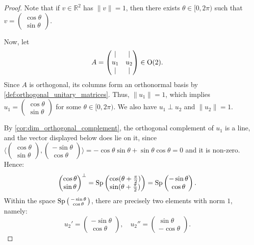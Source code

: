 \begin{proof}
Note that if $v \in \mathbb{R}^2$ has $\|v\| = 1$, then there exists $\theta \in [0, 2\pi)$ such that $v = \left(\begin{smallmatrix} \cos\theta \\ \sin\theta \end{smallmatrix}\right)$.

Now, let
\[
    A = \begin{pmatrix} | & | \\ u_1 & u_2 \\ | & | \end{pmatrix} \in \operatorname{O}(2).
\]
Since $A$ is orthogonal, its columns form an orthonormal basis by \cref{def:orthogonal_unitary_matrices}. Thus, $\|u_1\| = 1$, which implies $u_1 = \left(\begin{smallmatrix} \cos\theta \\ \sin\theta \end{smallmatrix}\right)$ for some $\theta \in [0, 2\pi)$. 
We also have $u_1 \perp u_2$ and $\|u_2\| = 1$. 

By \cref{cor:dim_orthogonal_complement}, the orthogonal complement of $u_1$ is a line, and the vector displayed below does lie on it, since $\langle \left(\begin{smallmatrix} \cos\theta \\ \sin\theta \end{smallmatrix}\right), \left(\begin{smallmatrix} -\sin\theta \\ \cos\theta \end{smallmatrix}\right) \rangle = -\cos\theta\sin\theta + \sin\theta\cos\theta = 0$ and it is non-zero. Hence:
\[ \begin{pmatrix} \cos\theta \\ \sin\theta \end{pmatrix}^\perp = \operatorname{Sp} \begin{pmatrix} \cos(\theta + \frac{\pi}{2}) \\ \sin(\theta + \frac{\pi}{2}) \end{pmatrix} = \operatorname{Sp} \begin{pmatrix} -\sin\theta \\ \cos\theta \end{pmatrix}. \]
Within the space $\operatorname{Sp}\left(\begin{smallmatrix} -\sin\theta \\ \cos\theta \end{smallmatrix}\right)$, there are precisely two elements with norm $1$, namely:
\[ u_2' = \begin{pmatrix} -\sin\theta \\ \cos\theta \end{pmatrix}, \quad u_2'' = \begin{pmatrix} \sin\theta \\ -\cos\theta \end{pmatrix}. \]


\end{proof}
